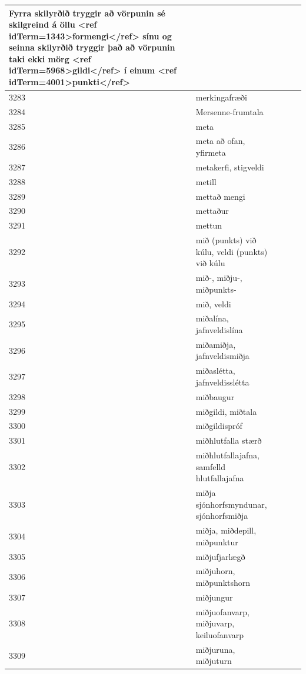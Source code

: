 \begin{longtable}{p{}|p{}|p{}|p{}|p{}}
Fyrra skilyrðið tryggir að vörpunin sé skilgreind á öllu <ref idTerm=1343>formengi</ref> sínu og seinna skilyrðið tryggir það að vörpunin taki ekki mörg <ref idTerm=5968>gildi</ref> í einum <ref idTerm=4001>punkti</ref> & \\
\hline
3283 & merkingafræði &  &  &  \\
\hline
3284 & Mersenne-frumtala &  &  &  \\
\hline
3285 & meta &  &  &  \\
\hline
3286 & meta að ofan, yfirmeta &  &  &  \\
\hline
3287 & metakerfi, stigveldi &  &  &  \\
\hline
3288 & metill &  &  &  \\
\hline
3289 & mettað mengi &  &  &  \\
\hline
3290 & mettaður &  &  &  \\
\hline
3291 & mettun &  &  &  \\
\hline
3292 & mið (punkts) við kúlu, veldi (punkts) við kúlu &  &  &  \\
\hline
3293 & mið-, miðju-, miðpunkts- &  &  &  \\
\hline
3294 & mið, veldi &  &  &  \\
\hline
3295 & miðalína, jafnveldislína &  &  &  \\
\hline
3296 & miðamiðja, jafnveldismiðja &  &  &  \\
\hline
3297 & miðaslétta, jafnveldisslétta &  &  &  \\
\hline
3298 & miðbaugur &  &  &  \\
\hline
3299 & miðgildi, miðtala &  &  &  \\
\hline
3300 & miðgildispróf &  &  &  \\
\hline
3301 & miðhlutfalla stærð &  &  &  \\
\hline
3302 & miðhlutfallajafna, samfelld hlutfallajafna &  &  &  \\
\hline
3303 & miðja sjónhorfsmyndunar, sjónhorfsmiðja &  &  &  \\
\hline
3304 & miðja, miðdepill, miðpunktur &  &  &  \\
\hline
3305 & miðjufjarlægð &  &  &  \\
\hline
3306 & miðjuhorn, miðpunktshorn &  &  &  \\
\hline
3307 & miðjungur &  &  &  \\
\hline
3308 & miðjuofanvarp, miðjuvarp, keiluofanvarp &  &  &  \\
\hline
3309 & miðjuruna, miðjuturn &  &  &  \\

\end{longtable}

